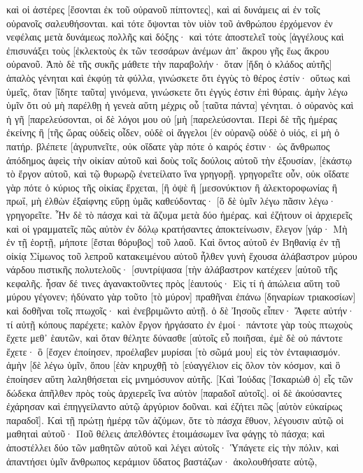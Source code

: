 καὶ οἱ ἀστέρες [ἔσονται ἐκ τοῦ οὐρανοῦ πίπτοντες], καὶ αἱ δυνάμεις αἱ ἐν τοῖς οὐρανοῖς σαλευθήσονται. 
καὶ τότε ὄψονται τὸν υἱὸν τοῦ ἀνθρώπου ἐρχόμενον ἐν νεφέλαις μετὰ δυνάμεως πολλῆς καὶ δόξης· 
καὶ τότε ἀποστελεῖ τοὺς [ἀγγέλους καὶ ἐπισυνάξει τοὺς [ἐκλεκτοὺς ἐκ τῶν τεσσάρων ἀνέμων ἀπ᾽ ἄκρου γῆς ἕως ἄκρου οὐρανοῦ. 
Ἀπὸ δὲ τῆς συκῆς μάθετε τὴν παραβολήν· ὅταν [ἤδη ὁ κλάδος αὐτῆς] ἁπαλὸς γένηται καὶ ἐκφύῃ τὰ φύλλα, γινώσκετε ὅτι ἐγγὺς τὸ θέρος ἐστίν· 
οὕτως καὶ ὑμεῖς, ὅταν [ἴδητε ταῦτα] γινόμενα, γινώσκετε ὅτι ἐγγύς ἐστιν ἐπὶ θύραις. 
ἀμὴν λέγω ὑμῖν ὅτι οὐ μὴ παρέλθῃ ἡ γενεὰ αὕτη μέχρις οὗ [ταῦτα πάντα] γένηται. 
ὁ οὐρανὸς καὶ ἡ γῆ [παρελεύσονται, οἱ δὲ λόγοι μου οὐ [μὴ [παρελεύσονται. 
Περὶ δὲ τῆς ἡμέρας ἐκείνης ἢ [τῆς ὥρας οὐδεὶς οἶδεν, οὐδὲ οἱ ἄγγελοι [ἐν οὐρανῷ οὐδὲ ὁ υἱός, εἰ μὴ ὁ πατήρ. 
βλέπετε [ἀγρυπνεῖτε, οὐκ οἴδατε γὰρ πότε ὁ καιρός ἐστιν· 
ὡς ἄνθρωπος ἀπόδημος ἀφεὶς τὴν οἰκίαν αὐτοῦ καὶ δοὺς τοῖς δούλοις αὐτοῦ τὴν ἐξουσίαν, [ἑκάστῳ τὸ ἔργον αὐτοῦ, καὶ τῷ θυρωρῷ ἐνετείλατο ἵνα γρηγορῇ. 
γρηγορεῖτε οὖν, οὐκ οἴδατε γὰρ πότε ὁ κύριος τῆς οἰκίας ἔρχεται, [ἢ ὀψὲ ἢ [μεσονύκτιον ἢ ἀλεκτοροφωνίας ἢ πρωΐ, 
μὴ ἐλθὼν ἐξαίφνης εὕρῃ ὑμᾶς καθεύδοντας· 
[ὃ δὲ ὑμῖν λέγω πᾶσιν λέγω· γρηγορεῖτε. 
Ἦν δὲ τὸ πάσχα καὶ τὰ ἄζυμα μετὰ δύο ἡμέρας. καὶ ἐζήτουν οἱ ἀρχιερεῖς καὶ οἱ γραμματεῖς πῶς αὐτὸν ἐν δόλῳ κρατήσαντες ἀποκτείνωσιν, 
ἔλεγον [γάρ· Μὴ ἐν τῇ ἑορτῇ, μήποτε [ἔσται θόρυβος] τοῦ λαοῦ. 
Καὶ ὄντος αὐτοῦ ἐν Βηθανίᾳ ἐν τῇ οἰκίᾳ Σίμωνος τοῦ λεπροῦ κατακειμένου αὐτοῦ ἦλθεν γυνὴ ἔχουσα ἀλάβαστρον μύρου νάρδου πιστικῆς πολυτελοῦς· [συντρίψασα [τὴν ἀλάβαστρον κατέχεεν [αὐτοῦ τῆς κεφαλῆς. 
ἦσαν δέ τινες ἀγανακτοῦντες πρὸς [ἑαυτούς· Εἰς τί ἡ ἀπώλεια αὕτη τοῦ μύρου γέγονεν; 
ἠδύνατο γὰρ τοῦτο [τὸ μύρον] πραθῆναι ἐπάνω [δηναρίων τριακοσίων] καὶ δοθῆναι τοῖς πτωχοῖς· καὶ ἐνεβριμῶντο αὐτῇ. 
ὁ δὲ Ἰησοῦς εἶπεν· Ἄφετε αὐτήν· τί αὐτῇ κόπους παρέχετε; καλὸν ἔργον ἠργάσατο ἐν ἐμοί· 
πάντοτε γὰρ τοὺς πτωχοὺς ἔχετε μεθ᾽ ἑαυτῶν, καὶ ὅταν θέλητε δύνασθε [αὐτοῖς εὖ ποιῆσαι, ἐμὲ δὲ οὐ πάντοτε ἔχετε· 
ὃ [ἔσχεν ἐποίησεν, προέλαβεν μυρίσαι [τὸ σῶμά μου] εἰς τὸν ἐνταφιασμόν. 
ἀμὴν [δὲ λέγω ὑμῖν, ὅπου [ἐὰν κηρυχθῇ τὸ [εὐαγγέλιον εἰς ὅλον τὸν κόσμον, καὶ ὃ ἐποίησεν αὕτη λαληθήσεται εἰς μνημόσυνον αὐτῆς. 
[Καὶ Ἰούδας [Ἰσκαριὼθ ὁ] εἷς τῶν δώδεκα ἀπῆλθεν πρὸς τοὺς ἀρχιερεῖς ἵνα αὐτὸν [παραδοῖ αὐτοῖς]. 
οἱ δὲ ἀκούσαντες ἐχάρησαν καὶ ἐπηγγείλαντο αὐτῷ ἀργύριον δοῦναι. καὶ ἐζήτει πῶς [αὐτὸν εὐκαίρως παραδοῖ]. 
Καὶ τῇ πρώτῃ ἡμέρᾳ τῶν ἀζύμων, ὅτε τὸ πάσχα ἔθυον, λέγουσιν αὐτῷ οἱ μαθηταὶ αὐτοῦ· Ποῦ θέλεις ἀπελθόντες ἑτοιμάσωμεν ἵνα φάγῃς τὸ πάσχα; 
καὶ ἀποστέλλει δύο τῶν μαθητῶν αὐτοῦ καὶ λέγει αὐτοῖς· Ὑπάγετε εἰς τὴν πόλιν, καὶ ἀπαντήσει ὑμῖν ἄνθρωπος κεράμιον ὕδατος βαστάζων· ἀκολουθήσατε αὐτῷ, 
